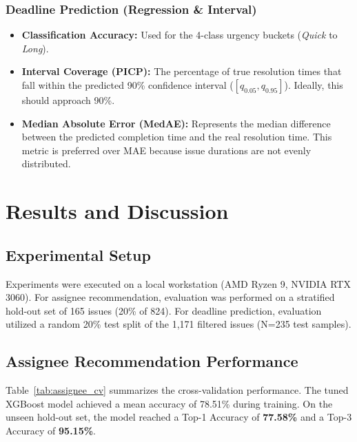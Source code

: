\documentclass[conference]{IEEEtran}
\begin{document}
\subsubsection{Deadline Prediction (Regression \& Interval)}
\begin{itemize}
    \item \textbf{Classification Accuracy:} Used for the 4-class urgency buckets (\textit{Quick} to \textit{Long}).
    \item \textbf{Interval Coverage (PICP):} The percentage of true resolution times that fall within the predicted 90\% confidence interval ($[q_{0.05}, q_{0.95}]$). Ideally, this should approach 90\%.
    \item \textbf{Median Absolute Error (MedAE):} Represents the median difference between the predicted completion time and the real resolution time. This metric is preferred over MAE because issue durations are not evenly distributed.
\end{itemize}

\section{Results and Discussion}

\subsection{Experimental Setup}

Experiments were executed on a local workstation (AMD Ryzen 9, NVIDIA RTX 3060). For assignee recommendation, evaluation was performed on a stratified hold-out set of 165 issues (20\% of 824). For deadline prediction, evaluation utilized a random 20\% test split of the 1,171 filtered issues (N=235 test samples).

\subsection{Assignee Recommendation Performance}

Table~\ref{tab:assignee_cv} summarizes the cross-validation performance. The tuned XGBoost model achieved a mean accuracy of 78.51\% during training. On the unseen hold-out set, the model reached a Top-1 Accuracy of \textbf{77.58\%} and a Top-3 Accuracy of \textbf{95.15\%}.
\end{document}
